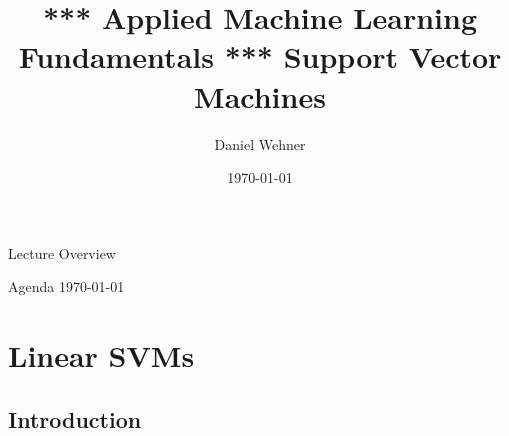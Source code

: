 


\title[Support Vector Machines]{*** Applied Machine Learning Fundamentals *** Support Vector Machines}
\author{Daniel Wehner}
\date{\today}




\maketitlepage


\begin{frame}{Lecture Overview}{}
\end{frame}


\begin{frame}{Agenda \today}
	\begin{multicols}{2}
		\tableofcontents
	\end{multicols}
\end{frame}


\section{Linear SVMs}

\subsection{Introduction}

